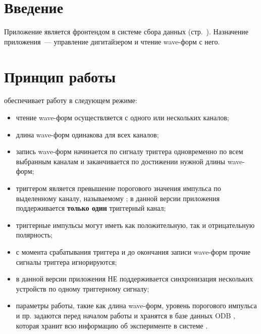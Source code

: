 

%


\section{Введение}

Приложение  является фронтендом \cite{MidasWikiFrontend} в системе сбора данных \MIDAS{} (стр.~\pageref{sec-midas-frontend}). Назначение приложения~--- управление дигитайзером \DEVICE{} и чтение wave-форм с него.

\section{Принцип работы}
\label{sec_basic}

 обеспечивает работу \DEVICE{} в следующем режиме:

\begin{itemize}
\item чтение wave-форм осуществляется с одного или нескольких каналов;
\item длина wave-форм одинакова для всех каналов;
\item запись wave-форм начинается по сигналу триггера одновременно по всем выбранным каналам и заканчивается по достижении нужной длины wave-форм;
\item триггером является превышение порогового значения импульса  по выделенному каналу, называемому  \cite{CaenUM3051ST}; в данной версии приложения поддерживается {\bf только один} триггерный канал;
\item триггерные импульсы могут иметь как положительную, так и отрицательную полярность;
\item с момента срабатывания триггера и до окончания записи wave-форм прочие сигналы триггера игнорируются;
\item в данной версии приложения НЕ поддерживается синхронизация нескольких устройств \DEVICE{} по одному триггерному сигналу;
\item параметры работы, такие как длина wave-форм, уровень порогового импульса и пр. задаются перед началом работы и хранятся в базе данных ODB \cite{MidasWikiODB}, которая хранит всю информацию об эксперименте в системе \MIDAS{}.
\end{itemize}

